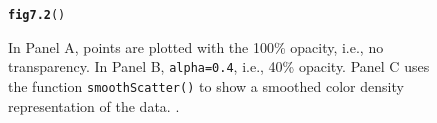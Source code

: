 \documentclass[12pt, a4paper,  BCOR=8.25mm, DIV=15]{scrartcl}\usepackage[]{graphicx}\usepackage[]{color}
\makeatletter
\newcommand{\hlstd}[1]{\textcolor[rgb]{0.345,0.345,0.345}{#1}}%
\newcommand{\hlkwd}[1]{\textcolor[rgb]{0.737,0.353,0.396}{\textbf{#1}}}%
\newenvironment{kframe}{%
 \def\at@end@of@kframe{}%
 \ifinner\ifhmode%
  \def\at@end@of@kframe{\end{minipage}}%
  \begin{minipage}{\columnwidth}%
 \fi\fi%
 \def\FrameCommand##1{\hskip\@totalleftmargin \hskip-\fboxsep
 \colorbox{shadecolor}{##1}\hskip-\fboxsep
     \hskip-\linewidth \hskip-\@totalleftmargin \hskip\columnwidth}%
 \MakeFramed {\advance\hsize-\width
   \@totalleftmargin\z@ \linewidth\hsize
   \@setminipage}}%
 {\par\unskip\endMakeFramed%
 \at@end@of@kframe}
\newenvironment{knitrout}{}{} %
\newcommand{\txtt}[1]{{\texttt{#1}}}
\makeatother
\begin{document}
\begin{figure}[ht]
\begin{knitrout}
\color{fgcolor}\begin{kframe}
\begin{alltt}
\hlkwd{fig7.2}\hlstd{()}
\end{alltt}


{\ttfamily\noindent\bfseries{}}\end{kframe}
\end{knitrout}
\caption{In Panel A, points are plotted with the 100\% opacity, i.e.,
  no transparency. In Panel B, \txtt{alpha=0.4}, i.e., 40\% opacity.
  Panel C uses the function \txtt{smoothScatter()} to show a smoothed
  color density representation of the data.
  \label{fig:alpha}.}
\end{figure}
\end{document}
